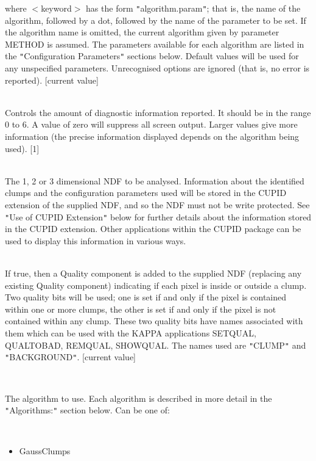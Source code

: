 \documentclass[twoside,11pt]{article}
\renewcommand{\_}{\texttt{\symbol{95}}}
\newcommand{\sstsubsection}[1]{ \item[{#1}] \mbox{} \\}
\newcommand{\sstitemlist}[1]{
  \mbox{} \\
  \vspace{-3.5ex}
  \begin{itemize}
     #1
  \end{itemize}
}
\newcommand{\sstitem}{\item}
\newcommand{\sstsubsection}[1]{\item[{#1}]}
\newcommand{\sstitemlist}[1]{
      \begin{itemize}
         #1
      \end{itemize}
      \\
   }
\newcommand{\sstitem}{\item}
\begin{document}
{{{         where $<$keyword$>$ has the form {\tt "}algorithm.param{\tt "}; that is, the name
         of the algorithm, followed by a dot, followed by the name of the
         parameter to be set. If the algorithm name is omitted, the current
         algorithm given by parameter METHOD is assumed. The parameters
         available for each algorithm are listed in the {\tt "}Configuration
         Parameters{\tt "} sections below. Default values will be used for any
         unspecified parameters. Unrecognised options are ignored (that is,
         no error is reported). [current value]
      }
      \sstsubsection{
         ILEVEL = \_INTEGER (Read)
      }{
         Controls the amount of diagnostic information reported. It
         should be in the range 0 to 6. A value of zero will suppress all
         screen output. Larger values give more information (the precise
         information displayed depends on the algorithm being used). [1]
      }
      \sstsubsection{
         IN = NDF (Update)
      }{
         The 1, 2 or 3 dimensional NDF to be analysed. Information about
         the identified clumps and the configuration parameters used will
         be stored in the CUPID extension of the supplied NDF, and so the
         NDF must not be write protected. See {\tt "}Use of CUPID Extension{\tt "}
         below for further details about the information stored in the CUPID
         extension. Other applications within the CUPID package can be used
         to display this information in various ways.
      }
      \sstsubsection{
         MASK = \_LOGICAL (Read)
      }{
         If true, then a Quality component is added to the supplied NDF
         (replacing any existing Quality component) indicating if each pixel
         is inside or outside a clump. Two quality bits will be used; one is
         set if and only if the pixel is contained within one or more clumps,
         the other is set if and only if the pixel is not contained within
         any clump. These two quality bits have names associated with
         them which can be used with the KAPPA applications SETQUAL,
         QUALTOBAD, REMQUAL, SHOWQUAL. The names used are {\tt "}CLUMP{\tt "} and
         {\tt "}BACKGROUND{\tt "}. [current value]
      }
      \sstsubsection{
         METHOD = LITERAL (Read)
      }{
         The algorithm to use. Each algorithm is described in more detail
         in the {\tt "}Algorithms:{\tt "} section below. Can be one of:

         \sstitemlist{

            \sstitem
            GaussClumps

}}}}
\end{document}

